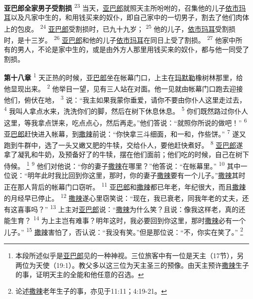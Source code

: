 \textbf{亚巴郎全家男子受割损\quad}
\textsuperscript{23}
当天，\uline{亚巴郎}就照天主所吩咐的，召集他的儿子\uline{依市玛耳}以及凡家中生的，和用钱买来的奴仆，即自己家中的一切男子，割去了他们肉体上的包皮。
\textsuperscript{24}
\uline{亚巴郎}受割损时，已九十九岁；
\textsuperscript{25}
他的儿子，\uline{依市玛耳}受割损时，是十三岁。
\textsuperscript{26}
\uline{亚巴郎}和他的儿子\uline{依市玛耳}在同日上受了割损。
\textsuperscript{27}
他家中所有的男人，不论是家中生的，或是由外方人那里用钱买来的奴仆，都与他一同受了割损。

\textbf{第十八章\quad}
\textsuperscript{1}
天正热的时候，\uline{亚巴郎}坐在帐幕门口，上主在\uline{玛默勒}橡树林那里，给他显现出来。
\textsuperscript{2}
他举目一望，见有三人站在对面。他一见就由帐幕门口跑去迎接他们，俯伏在地，
\textsuperscript{3}
说：“我主如果我蒙你垂爱，请你不要由你仆人这里走过去，
\textsuperscript{4}
我叫人拿点水来，洗洗你们的脚，然后在树下休息休息。
\textsuperscript{5}
你们既然路过你仆人这里，等我拿点饼来，吃点点心，然后再走。”他们答说：“就照你所说的做吧！”
\textsuperscript{6}
\uline{亚巴郎}赶快进入帐幕，到\uline{撒辣}前说：“你快拿三斗细面，和一和，作些饼。”
\textsuperscript{7}
遂又跑到牛群中，选了一头又嫩又肥的牛犊，交给仆人，要他赶快煮好。
\textsuperscript{8}
\uline{亚巴郎}遂拿了凝乳和牛奶，及预备好了的牛犊，摆在他们面前；他们吃的时候，自己在树下侍候。
\footnote{本段所述似乎是\uline{亚巴郎}见的一种神视。三位旅客中有一位是天主（17节），另两位为天使（19:1）。教父多以这三位为天主圣三的预像。由天主预许\uline{撒辣}生子的事，证明天主的全能和他任意的召选。}
\textsuperscript{9}
他们对他说：“你的妻子\uline{撒辣}在哪里？”他答说：“在帐幕里。”
\textsuperscript{10}
其中一位说：“明年此时我比回到你这里，那时，你的妻子\uline{撒辣}要有一个儿子。”\uline{撒辣}其时正在那人背后的帐幕门口窃听。
\textsuperscript{11}
\uline{亚巴郎}和\uline{撒辣}都已年老，年纪很大，而且\uline{撒辣}的月经早已停止。
\textsuperscript{12}
\uline{撒辣}遂心里窃笑说：“现在，我已衰老，同我年老的丈夫，还有这喜事吗？”
\textsuperscript{13}
上主对\uline{亚巴郎}说：“\uline{撒辣}为什么笑？且说：像我这样老，真的还能生育？
\textsuperscript{14}
为上主岂有难事？明年这时，我必要回到你这里，那时\uline{撒辣}必有一个儿子。”
\textsuperscript{15}
\uline{撒辣}害怕了，否认说：“我没有笑。”但是那位说：“不，你实在笑了。”
\footnote{论述\uline{撒辣}老年生子的事，亦见于11:11；4:19-21。}

